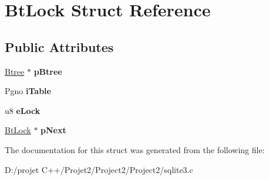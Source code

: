 \hypertarget{struct_bt_lock}{}\section{Bt\+Lock Struct Reference}
\label{struct_bt_lock}
\subsection*{Public Attributes}
\begin{DoxyCompactItemize}
\item 
\mbox{\label{struct_bt_lock_ab9125b8e79d480b75f3af21cb2ab55c7}} 
\mbox{\hyperlink{struct_btree}{Btree}} $\ast$ {\bfseries p\+Btree}
\item 
\mbox{\label{struct_bt_lock_a822efcf018d6c8eb343341cde5df980d}} 
Pgno {\bfseries i\+Table}
\item 
\mbox{\label{struct_bt_lock_abe07b71018ee423e0d94b5cdba044b5c}} 
u8 {\bfseries e\+Lock}
\item 
\mbox{\label{struct_bt_lock_ad42de86209c7aab43604c52a549b7bca}} 
\mbox{\hyperlink{struct_bt_lock}{Bt\+Lock}} $\ast$ {\bfseries p\+Next}
\end{DoxyCompactItemize}


The documentation for this struct was generated from the following file\+:\begin{DoxyCompactItemize}
\item 
D\+:/projet C++/\+Projet2/\+Project2/\+Project2/sqlite3.\+c\end{DoxyCompactItemize}

